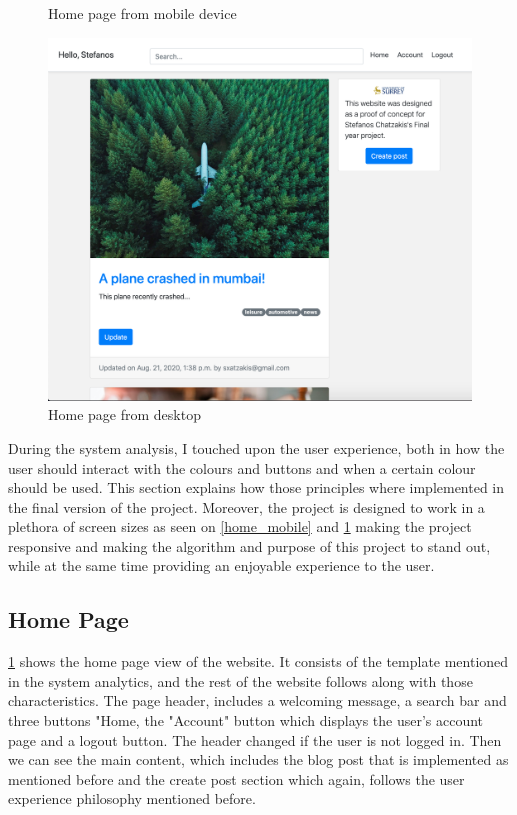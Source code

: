 \begin{figure}[htbp]
\begin{minipage}[t]{0.45\linewidth}
    \caption{Home page from mobile device}
    \label{home_mobile}
\end{minipage}%
    \hfill%
\begin{minipage}[t]{0.45\linewidth}
    \includegraphics[width=\linewidth]{Figures/home_pc}
    \caption{Home page from desktop}
    \label{home_pc}
\end{minipage}
\end{figure}

During the system analysis, I touched upon the user experience, both in how the user should interact with the colours and buttons and when a certain colour should be used. This section explains how those principles where implemented in the final version of the project. Moreover, the project is designed to work in a plethora of screen sizes as seen on \ref{home_mobile} and \ref{home_pc} making the project responsive and making the algorithm and purpose of this project to stand out, while at the same time providing an enjoyable experience to the user.

\subsection{Home Page}

\ref{home_pc} shows the home page view of the website. It consists of the template mentioned in the system analytics, and the rest of the website follows along with those characteristics. The page header, includes a welcoming message, a search bar and three buttons "Home, the "Account" button which displays the user's account page and a logout button. The header changed if the user is not logged in. Then we can see the main content, which includes the blog post that is implemented as mentioned before and the create post section which again, follows the user experience philosophy mentioned before.

